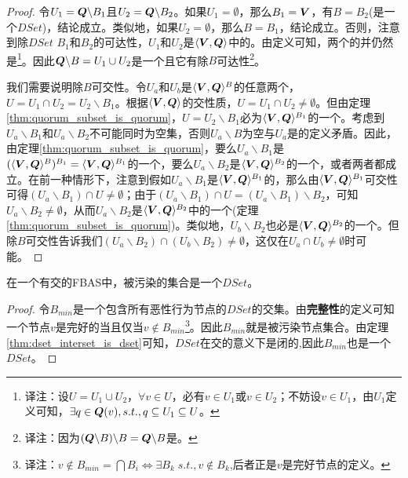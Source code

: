 \begin{proof}
        令$U_1={\bm Q}\backslash B_1$且$U_2={\bm Q}\backslash B_2$。如果$U_1=\emptyset$，那么$B_1={\bm V}$，有$B=B_2$(是一个$DSet$)，结论成立。类似地，如果$U_2=\emptyset$，那么$B=B_1$，结论成立。否则，注意到除$DSet$ $B_1$和$B_2$的{\quorum}可达性，$U_1$和$U_2$是$\langle{\bm V},{\bm Q}\rangle$中的{\quorum}。由定义可知，两个{\quorum}的并仍然是{\quorum}{\footnote{译注：设$U=U_1\cup U_2$，$\forall v\in U$，必有$v\in U_1$或$v\in U_2$；不妨设$v\in U_1$，由$U_1$定义可知，$\exists q\in {\bm Q}(v), s.t., q\subseteq U_1\subseteq U$。}}。因此${{\bm Q}\backslash B}=U_1\cup U_2$是一个{\quorum}且它有除$B${\quorum}可达性{\footnote{译注：因为$({\bm Q}\backslash B)\backslash B={\bm Q}\backslash B$是{\quorum}。}}。
        
        我们需要说明除$B${\quorum}可交性。令$U_a$和$U_b$是$\langle{\bm V},{\bm Q}\rangle^{B}$的任意两个{\quorum}，$U=U_1\cap U_2 = U_2\backslash B_1$。根据$\langle{\bm V},{\bm Q}\rangle$的{\quorum}交性质，$U=U_1\cap U_2  \neq \emptyset$。但由定理\ref{thm:quorum_subset_is_quorum}，$U=U_2\backslash B_1$必为$\langle{\bm V},{\bm Q}\rangle^{B_1}$的一个{\quorum}。考虑到$U_a\backslash B_1$和$U_a\backslash B_2$不可能同时为空集，否则$U_a\backslash B$为空与$U_a$是{\quorum}的定义矛盾。因此，由定理\ref{thm:quorum_subset_is_quorum}，要么$U_a\backslash B_1$是$(\langle{\bm V},{\bm Q}\rangle^{B})^{B_1}=\langle{\bm V},{\bm Q}\rangle^{B_1}$的一个{\quorum}，要么$U_a\backslash B_2$是$\langle{\bm V},{\bm Q}\rangle^{B_2}$的一个{\quorum}，或者两者都成立。在前一种情形下，注意到假如$U_a\backslash B_1$是$\langle{\bm V},{\bm Q}\rangle^{B_1}$的{\quorum}，那么由$\langle{\bm V},{\bm Q}\rangle^{B_1}${\quorum}可交性可得$(U_a\backslash B_1)\cap U\neq \emptyset$；由于$(U_a\backslash B_1)\cap U = (U_a\backslash B_1)\backslash B_2$，可知$U_a\backslash B_2\neq \emptyset$，从而$U_a\backslash B_2$是$\langle{\bm V},{\bm Q}\rangle^{B_2}$中的一个{\quorum}(定理\ref{thm:quorum_subset_is_quorum})。类似地，$U_b\backslash B_2$也必是$\langle{\bm V},{\bm Q}\rangle^{B_2}$的一个{\quorum}。但除$B${\quorum}可交性告诉我们$(U_a\backslash B_2)\cap (U_b\backslash B_2)\neq \emptyset$，这仅在$U_a\cap U_b\neq \emptyset$时可能。
\end{proof}

\begin{theorem}\label{thm:befouleds_are_dset}
        在一个有{\quorum}交的FBAS中，被污染的集合是一个$DSet$。
\end{theorem}

\begin{proof}
        令$B_{min}$是一个包含所有恶性行为节点的$DSet$的交集。由\textbf{完整性}的定义可知一个节点$v$是完好的当且仅当$v\not\in B_{min}${\footnote{译注：$v\not\in B_{min}=\bigcap B_{i}\iff \exists B_{k}\;s.t., v\not\in B_{k}$,后者正是$v$是完好节点的定义。}}。因此$B_{min}$就是被污染节点集合。由定理\ref{thm:dset_interset_is_dset}可知，$DSet$在交的意义下是闭的,因此$B_{min}$也是一个$DSet$。
\end{proof}

